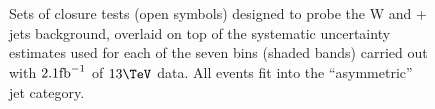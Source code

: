 \clearpage
\begin{figure}[h!]
  \begin{center}
     ~~
     \\
     ~~
     \\
    \caption{Sets of closure tests (open symbols) designed to probe
      the W and \ttbar + jets background, overlaid on top of
      the systematic uncertainty estimates used for each of the seven
      \scalht bins (shaded bands) carried out with $2.1\ifb$ of
      $13\tev$ data. All events fit into the ``asymmetric'' jet
      category.}
    \label{fig:ttWclosureDataAsym}
  \end{center} 
\end{figure}


